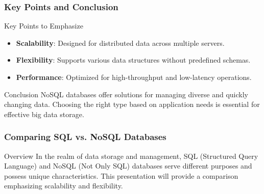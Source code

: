 \documentclass[aspectratio=169]{beamer}
\begin{document}
\begin{frame}[fragile]
    \frametitle{Key Points and Conclusion}
    \begin{block}{Key Points to Emphasize}
        \begin{itemize}
            \item \textbf{Scalability}: Designed for distributed data across multiple servers.
            \item \textbf{Flexibility}: Supports various data structures without predefined schemas.
            \item \textbf{Performance}: Optimized for high-throughput and low-latency operations.
        \end{itemize}
    \end{block}

    \begin{block}{Conclusion}
        NoSQL databases offer solutions for managing diverse and quickly changing data. Choosing the right type based on application needs is essential for effective big data storage.
    \end{block}
\end{frame}

\begin{frame}[fragile]
    \frametitle{Comparing SQL vs. NoSQL Databases}
    \begin{block}{Overview}
        In the realm of data storage and management, SQL (Structured Query Language) and NoSQL (Not Only SQL) databases serve different purposes and possess unique characteristics. This presentation will provide a comparison emphasizing scalability and flexibility.
    \end{block}
\end{frame}
\end{document}
